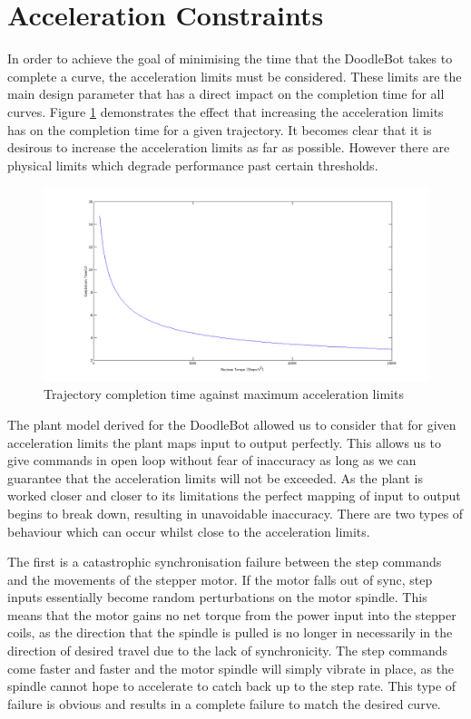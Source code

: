 \section{Acceleration Constraints}
In order to achieve the goal of minimising the time that the DoodleBot takes to complete a curve, the acceleration limits must be considered. These limits are the main design parameter that has a direct impact on the completion time for all curves. Figure \ref{fig:maxAccel} demonstrates the effect that increasing the acceleration limits has on the completion time for a given trajectory. It becomes clear that it is desirous to increase the acceleration limits as far as possible. However there are physical limits which degrade performance past certain thresholds.

\begin{figure}[htbp]  
\includegraphics[width=\textwidth]{figures/performance/maxTorque.png}
\caption[Trajectory completion time against maximum acceleration limits]{Trajectory completion time against maximum acceleration limits
\label{fig:maxAccel}}
\end{figure}  	

The plant model derived for the DoodleBot allowed us to consider that for given acceleration limits the plant maps input to output perfectly. This allows us to give commands in open loop without fear of inaccuracy as long as we can guarantee that the acceleration limits will not be exceeded. As the plant is worked closer and closer to its limitations the perfect mapping of input to output begins to break down, resulting in unavoidable inaccuracy. There are two types of behaviour which can occur whilst close to the acceleration limits. 

The first is a catastrophic synchronisation failure between the step commands and the movements of the stepper motor. If the motor falls out of sync, step inputs essentially become random perturbations on the motor spindle. This means that the motor gains no net torque from the power input into the stepper coils, as the direction that the spindle is pulled is no longer in necessarily in the direction of desired travel due to the lack of synchronicity. The step commands come faster and faster and the motor spindle will simply vibrate in place, as the spindle cannot hope to accelerate to catch back up to the step rate. This type of failure is obvious and results in a complete failure to match the desired curve.

